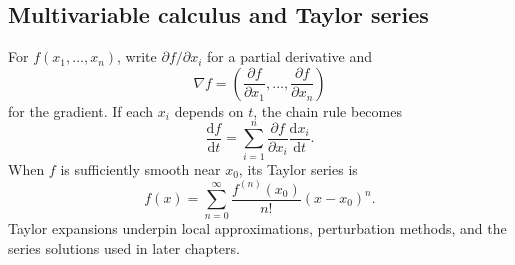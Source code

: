 \subsection{Multivariable calculus and Taylor series}

For $f(x_1,\ldots,x_n)$, write $\partial f/\partial x_i$ for a partial derivative and
\begin{equation}
\nabla f=\left(\frac{\partial f}{\partial x_1},\ldots,\frac{\partial f}{\partial x_n}\right)
\end{equation}
for the gradient. If each $x_i$ depends on $t$, the chain rule becomes
\begin{equation}
\frac{\mathrm{d}f}{\mathrm{d}t}=\sum_{i=1}^n\frac{\partial f}{\partial x_i}\frac{\mathrm{d}x_i}{\mathrm{d}t}.
\end{equation}
When $f$ is sufficiently smooth near $x_0$, its Taylor series is
\begin{equation}
f(x)=\sum_{n=0}^{\infty}\frac{f^{(n)}(x_0)}{n!}(x-x_0)^n.
\end{equation}
Taylor expansions underpin local approximations, perturbation methods, and the series solutions used in later chapters.
